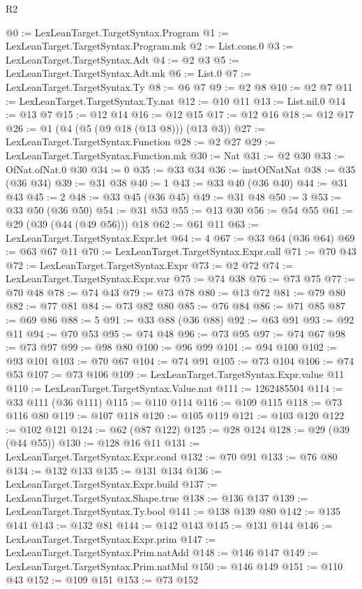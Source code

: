 \begin{lexlean}{R2}
\begin{coremodule}
@0 := LexLeanTarget.TargetSyntax.Program
@1 := LexLeanTarget.TargetSyntax.Program.mk
@2 := List.cons.{0}
@3 := LexLeanTarget.TargetSyntax.Adt
@4 := @2 @3
@5 := LexLeanTarget.TargetSyntax.Adt.mk
@6 := List.{0}
@7 := LexLeanTarget.TargetSyntax.Ty
@8 := @6 @7
@9 := @2 @8
@10 := @2 @7
@11 := LexLeanTarget.TargetSyntax.Ty.nat
@12 := @10 @11
@13 := List.nil.{0}
@14 := @13 @7
@15 := @12 @14
@16 := @12 @15
@17 := @12 @16
@18 := @12 @17
@26 := @1 (@4 (@5 (@9 @18 (@13 @8))) (@13 @3))
@27 := LexLeanTarget.TargetSyntax.Function
@28 := @2 @27
@29 := LexLeanTarget.TargetSyntax.Function.mk
@30 := Nat
@31 := @2 @30
@33 := OfNat.ofNat.{0} @30
@34 := 0
@35 := @33 @34
@36 := instOfNatNat
@38 := @35 (@36 @34)
@39 := @31 @38
@40 := 1
@43 := @33 @40 (@36 @40)
@44 := @31 @43
@45 := 2
@48 := @33 @45 (@36 @45)
@49 := @31 @48
@50 := 3
@53 := @33 @50 (@36 @50)
@54 := @31 @53
@55 := @13 @30
@56 := @54 @55
@61 := @29 (@39 (@44 (@49 @56))) @18
@62 := @61 @11
@63 := LexLeanTarget.TargetSyntax.Expr.let
@64 := 4
@67 := @33 @64 (@36 @64)
@69 := @63 @67 @11
@70 := LexLeanTarget.TargetSyntax.Expr.call
@71 := @70 @43
@72 := LexLeanTarget.TargetSyntax.Expr
@73 := @2 @72
@74 := LexLeanTarget.TargetSyntax.Expr.var
@75 := @74 @38
@76 := @73 @75
@77 := @70 @48
@78 := @74 @43
@79 := @73 @78
@80 := @13 @72
@81 := @79 @80
@82 := @77 @81
@84 := @73 @82 @80
@85 := @76 @84
@86 := @71 @85
@87 := @69 @86
@88 := 5
@91 := @33 @88 (@36 @88)
@92 := @63 @91
@93 := @92 @11
@94 := @70 @53
@95 := @74 @48
@96 := @73 @95
@97 := @74 @67
@98 := @73 @97
@99 := @98 @80
@100 := @96 @99
@101 := @94 @100
@102 := @93 @101
@103 := @70 @67
@104 := @74 @91
@105 := @73 @104
@106 := @74 @53
@107 := @73 @106
@109 := LexLeanTarget.TargetSyntax.Expr.value @11
@110 := LexLeanTarget.TargetSyntax.Value.nat
@111 := 1262485504
@114 := @33 @111 (@36 @111)
@115 := @110 @114
@116 := @109 @115
@118 := @73 @116 @80
@119 := @107 @118
@120 := @105 @119
@121 := @103 @120
@122 := @102 @121
@124 := @62 (@87 @122)
@125 := @28 @124
@128 := @29 (@39 (@44 @55))
@130 := @128 @16 @11
@131 := LexLeanTarget.TargetSyntax.Expr.cond
@132 := @70 @91
@133 := @76 @80
@134 := @132 @133
@135 := @131 @134
@136 := LexLeanTarget.TargetSyntax.Expr.build
@137 := LexLeanTarget.TargetSyntax.Shape.true
@138 := @136 @137
@139 := LexLeanTarget.TargetSyntax.Ty.bool
@141 := @138 @139 @80
@142 := @135 @141
@143 := @132 @81
@144 := @142 @143
@145 := @131 @144
@146 := LexLeanTarget.TargetSyntax.Expr.prim
@147 := LexLeanTarget.TargetSyntax.Prim.natAdd
@148 := @146 @147
@149 := LexLeanTarget.TargetSyntax.Prim.natMul
@150 := @146 @149
@151 := @110 @43
@152 := @109 @151
@153 := @73 @152

\end{coremodule}
\end{lexlean}
